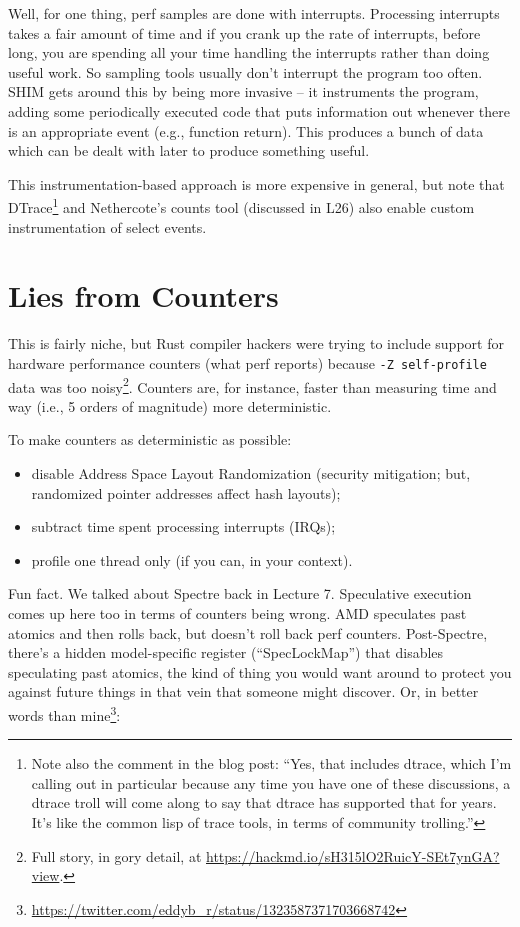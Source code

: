 Well, for one thing, perf samples are done with interrupts. Processing interrupts takes a fair amount of time and if you crank up the rate of interrupts, before long, you are spending all your time handling the interrupts rather than doing useful work. So sampling tools usually don't interrupt the program too often. SHIM gets around this by being more invasive -- it instruments the program, adding some periodically executed code that puts information out whenever there is an appropriate event (e.g., function return). This produces a bunch of data which can be dealt with later to produce something useful.

This instrumentation-based approach is more expensive in general, but note that DTrace\footnote{Note also the comment in the blog post: ``Yes, that includes dtrace, which I'm calling out in particular because any time you have one of these discussions, a dtrace troll will come along to say that dtrace has supported that for years. It's like the common lisp of trace tools, in terms of community trolling.''} and Nethercote's counts tool (discussed in L26) also enable custom instrumentation of select events. 

\section*{Lies from Counters}
This is fairly niche, but Rust compiler hackers were trying to include
support for hardware performance counters (what perf reports) because
{\tt -Z self-profile} data was too noisy\footnote{Full story, in gory
detail,
at \url{https://hackmd.io/sH315lO2RuicY-SEt7ynGA?view}.}. Counters
are, for instance, faster than measuring time and way (i.e., 5 orders of magnitude) more deterministic.

To make counters as deterministic as possible:
\begin{itemize}[noitemsep]
\item disable Address Space Layout Randomization (security mitigation; but, randomized pointer addresses affect hash layouts);
\item subtract time spent processing interrupts (IRQs);
\item profile one thread only (if you can, in your context).
\end{itemize}
Fun fact. We talked about Spectre back in Lecture 7. Speculative execution comes up here too in terms of
counters being wrong. AMD speculates past atomics and then rolls back, but doesn't roll back perf counters.
Post-Spectre, there's a hidden model-specific register (``SpecLockMap'') that disables speculating past atomics, the kind of thing you would
want around to protect you against future things in that vein that someone might discover. Or, in better words than mine\footnote{\url{https://twitter.com/eddyb_r/status/1323587371703668742}}:

